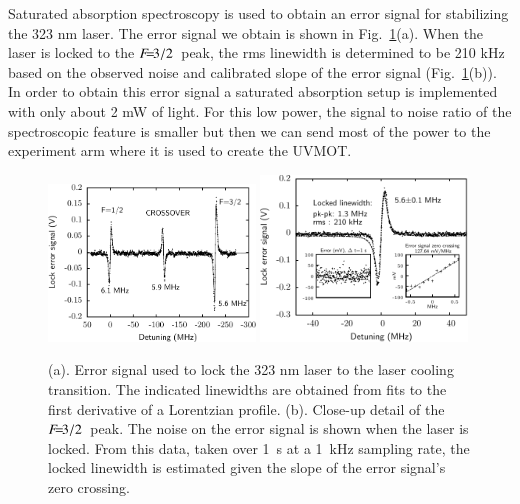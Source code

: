 \documentclass[oneside,12pt]{memoir}
\newcommand{\f}[1]{\ensuremath{F\hspace{-5pt}=\hspace{-4pt}#1}}
\begin{document}
Saturated absorption spectroscopy is used to obtain an error signal for
stabilizing the 323 nm laser. The error signal we obtain is shown in
Fig.~\ref{fig:323errsig}(a).  When the laser is locked to the \f{3/2}\ peak,
the rms linewidth is determined to be 210 kHz based on the observed noise and
calibrated slope of the error signal (Fig.~\ref{fig:323errsig}(b)).  In order
to obtain this error signal a saturated absorption setup is implemented with
only about 2 mW of light.  For this low power,  the  signal to noise ratio of
the spectroscopic feature is smaller  but then we can send  most of the power
to the experiment arm where it is used to create the UVMOT.  \begin{figure}
 \centering
\includegraphics[width=0.49\textwidth]{../figures/323setup/heatpipe-errsig/errsigeps.pdf}
\includegraphics[width=0.49\textwidth]{../figures/323setup/trap-lockfig/lockfigeps.pdf}
\caption[323 nm saturated absorption spectrum]{\small (a).  Error signal used
to lock the 323 nm laser to the laser cooling transition. The indicated
linewidths are obtained from fits to the first derivative of a Lorentzian
profile.  (b). Close-up detail of the \f{3/2}\ peak.  The noise on the error
signal is shown when the laser is locked.  From this data, taken over 1~s at a
1~kHz sampling rate, the locked linewidth is estimated given the slope of the
error signal's zero crossing. } \label{fig:323errsig} \end{figure}
\end{document}
